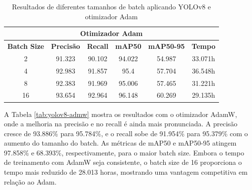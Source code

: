 \begin{table}[!hbt]
    \centering
    \begin{tabular}{|c|c|c|c|c|c|}
    \hline
    \multicolumn{6}{|c|}{\textbf{Otimizador Adam}} \\ \hline
    \textbf{Batch Size} & \textbf{Precisão} & \textbf{Recall} & \textbf{mAP50} & \textbf{mAP50-95} & \textbf{Tempo} \\ \hline
    2                   & 91.323                       & 90.102                     & 94.022                     & 54.987                        & 33.071h                         \\ \hline
    4                   & 92.983                       & 91.857                     & 95.4                       & 57.704                        & 36.548h                         \\ \hline
    8                   & 92.383                       & 91.969                     & 95.006                     & 57.465                        & 31.221h                         \\ \hline
    16                  & 93.654                       & 92.964                     & 96.148                     & 60.269                        & 29.135h                         \\ \hline
    \end{tabular}
    \caption{Resultados de diferentes tamanhos de batch aplicando YOLOv8 e otimizador Adam}
    \label{tab:yolov8-adm}
\end{table}

A Tabela \ref{tab:yolov8-admw} mostra os resultados com o otimizador AdamW, onde a melhoria na precisão e no recall é ainda mais pronunciada. A precisão cresce de 93.886\% para 95.784\%, e o recall sobe de 91.954\% para 95.379\% com o aumento do tamanho do batch. As métricas de mAP50 e mAP50-95 atingem 97.858\% e 68.393\%, respectivamente, para o maior batch size. Embora o tempo de treinamento com AdamW seja consistente, o batch size de 16 proporciona o tempo mais reduzido de 28.013 horas, mostrando uma vantagem competitiva em relação ao Adam.

